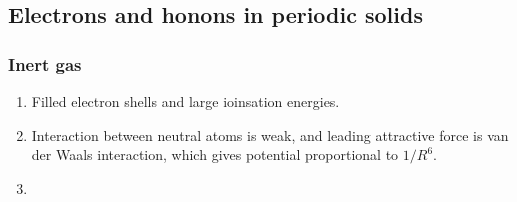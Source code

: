 \documentclass[12pt,a4paper]{article}
\begin{document}
        \subsubsection{}
\subsection{Electrons and honons in periodic solids}
    \subsubsection{Inert gas}
        \begin{enumerate}
            \item Filled electron shells and large ioinsation energies.
            \item Interaction between neutral atoms is weak, and leading attractive force is van der Waals interaction, which gives potential proportional to $1/R^6$.
            \item 
        \end{enumerate}

            
        
    
\end{document}
